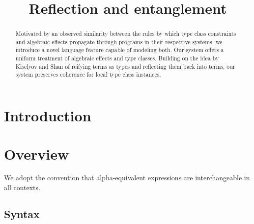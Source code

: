 \documentclass[12pt]{article}
\title{Reflection and entanglement}
\date{}
\begin{document}
  \maketitle

  \begin{abstract}
    Motivated by an observed similarity between the rules by which type class constraints and algebraic effects propagate through programs in their respective systems, we introduce a novel language feature capable of modeling both. Our system offers a uniform treatment of algebraic effects and type classes. Building on the idea by Kiselyov and Shan of reifying terms as types and reflecting them back into terms, our system preserves coherence for local type class instances.
  \end{abstract}

  \section{Introduction}

    \iffalse
      \begin{lstlisting}[gobble=4]
        reify "Hello" as a in
          x <- reflect a in
            x + ", World!"
      \end{lstlisting}
    \fi

  \section{Overview}

    We adopt the convention that alpha-equivalent expressions are interchangeable in all contexts.

    \subsection{Syntax}
\end{document}
